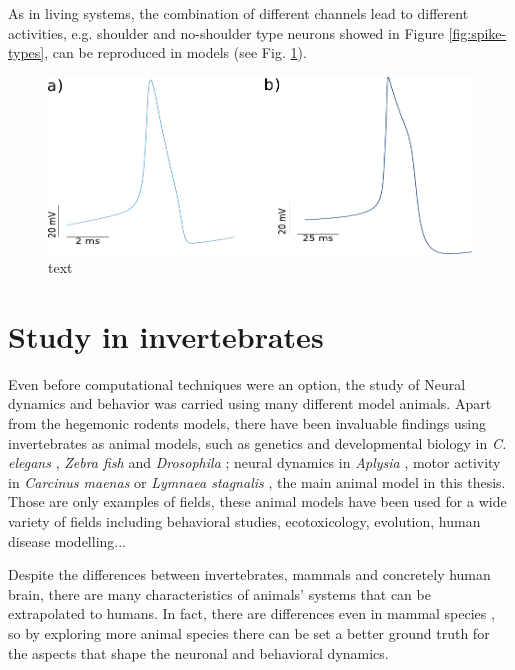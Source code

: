 As in living systems, the combination of different channels lead to different activities, e.g. shoulder and no-shoulder type neurons showed in Figure \ref{fig:spike-types}, can be reproduced in models (see Fig. \ref{fig:spike-types model}). 

\begin{figure}[htb!]
	\includegraphics[width=\textwidth]{img/intro/spike-types model.pdf}
	\caption{text}
	\label{fig:spike-types model}
\end{figure}



\section{Study in invertebrates}
\label{c-intro-invertebrates}
Even before computational techniques were an option, the study of Neural dynamics and behavior was carried using many different model animals. Apart from the hegemonic rodents models, there have been invaluable findings using invertebrates as animal models, such as genetics and developmental biology in \textit{C. elegans} \parencite{brenner_genetics_1974}, \textit{Zebra fish} \parencite{streisinger_production_1981} and \textit{Drosophila} \parencite{nusslein-volhard_mutations_1980}; neural dynamics in \textit{Aplysia} \parencite{HODGKIN1952,wachtel_direct_1967}, motor activity in \textit{Carcinus maenas} \parencite{eisen_mechanisms_1982} or \textit{Lymnaea stagnalis} \parencite{Benjamin1979b}, the main animal model in this thesis. Those are only examples of fields, these animal models have been used for a wide variety of fields including behavioral studies, ecotoxicology, evolution, human disease modelling... \parencite{romanova_animal_2018} 

Despite the differences between invertebrates, mammals and concretely human brain, there are many characteristics of animals' systems that can be extrapolated to humans. In fact, there are differences even in mammal species \parencite{preuss_taking_2000}, so by exploring more animal species there can be set a better ground truth for the aspects that shape the neuronal and behavioral dynamics. 


